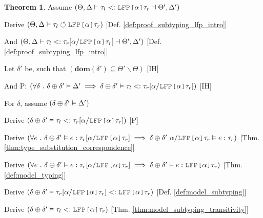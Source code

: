 \documentclass[acmsmall]{acmart}
\theoremstyle{definition}
\newtheorem{theorem}{Theorem}[section]
\begin{document}
\begin{theorem}
  \item \N Assume $(
    \Theta, \Delta \entails
    \tau_l \subtypes \J{LFP[} \alpha \J{]}\tau_r \given \Theta', \Delta'
  )$
  \item \I \N Derive $(
    \Theta, \Delta \entails \tau_l \circlearrowleft \J{LFP[} \alpha \J{]} \tau_r
  )$ [Def. \ref{def:proof_subtyping_lfp_intro}]
  \item \I \N And $(
    \Theta, \Delta \entails
    \tau_l \subtypes \tau_r[\alpha \slash \J{LFP[} \alpha \J{]} \tau_r]
    \given \Theta', \Delta'
  )$ [Def. \ref{def:proof_subtyping_lfp_intro}]

  \item \I \N Let $\delta'$ be, such that $(
    \textbf{dom}(\delta') \subseteq \Theta' \backslash \Theta
  )$ [IH]
  \item \I \N And P: $(
    \forall \delta \qua 
    \delta \oplus \delta' \satisfies \Delta' 
    \implies 
    \delta \oplus \delta' \satisfies
    \tau_l \subtypes \tau_r[\alpha \slash \J{LFP[} \alpha \J{]} \tau_r]
  )$ [IH]

  \item \I \N For $\delta$, assume $(
    \delta \oplus \delta' \vDash \Delta'
  )$

  \item \I\I \N Derive $(
    \delta \oplus \delta' \satisfies
    \tau_l \subtypes \tau_r[\alpha \slash \J{LFP[} \alpha \J{]} \tau_r]
  )$ [P]

  \item \I\I \N Derive $(
    \forall e \qua
    \delta \oplus \delta' \satisfies
    e \hastype \tau_r[\alpha \slash \J{LFP[} \alpha \J{]} \tau_r] 
    \implies 
    \delta \oplus \delta'\ \alpha \slash \J{LFP[} \alpha \J{]} \tau_r \satisfies
    e \hastype
    \tau_r
  )$ [Thm. \ref{thm:type_substitution_correspondence}]

  \item \I\I \N Derive $(
    \forall e \qua
    \delta \oplus \delta' \satisfies
    e \hastype \tau_r[\alpha \slash \J{LFP[} \alpha \J{]} \tau_r] 
    \implies 
    \delta \oplus \delta' \satisfies
    e \hastype
    \J{LFP[} \alpha \J{]} \tau_r
  )$ [Thm. \ref{def:model_typing}]

  \item \I\I \N Derive $(
    \delta \oplus \delta' \satisfies
    \tau_r[\alpha \slash \J{LFP[} \alpha \J{]} \tau_r] \subtypes \J{LFP[} \alpha \J{]} \tau_r
  )$ [Def. \ref{def:model_subtyping}]

  \item \I\I \N Derive $(
    \delta \oplus \delta' \satisfies
    \tau_l \subtypes \J{LFP[} \alpha \J{]} \tau_r
  )$ [Thm. \ref{thm:model_subtyping_transitivity}]


\end{theorem}
\end{document}
